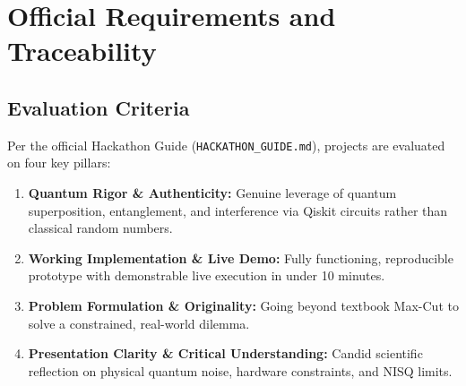 \section{Official Requirements and Traceability}

\subsection{Evaluation Criteria}
Per the official Hackathon Guide (\texttt{HACKATHON\_GUIDE.md}), projects are evaluated on four key pillars:
\begin{enumerate}
    \item \textbf{Quantum Rigor \& Authenticity:} Genuine leverage of quantum superposition, entanglement, and interference via Qiskit circuits rather than classical random numbers.
    \item \textbf{Working Implementation \& Live Demo:} Fully functioning, reproducible prototype with demonstrable live execution in under 10 minutes.
    \item \textbf{Problem Formulation \& Originality:} Going beyond textbook Max-Cut to solve a constrained, real-world dilemma.
    \item \textbf{Presentation Clarity \& Critical Understanding:} Candid scientific reflection on physical quantum noise, hardware constraints, and NISQ limits.
\end{enumerate}

